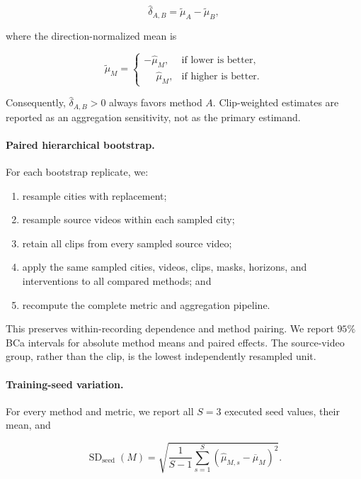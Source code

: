 \begin{equation*}
\widehat\delta_{A,B}
=
\widetilde\mu_A
-
\widetilde\mu_B,
\end{equation*}

where the direction-normalized mean is

\begin{equation*}
\widetilde\mu_M
=
\begin{cases}
-\widehat\mu_M, & \text{if lower is better},\\
\phantom{-}\widehat\mu_M, & \text{if higher is better}.
\end{cases}
\end{equation*}

Consequently, \(\widehat\delta_{A,B}>0\) always favors method \(A\).
Clip-weighted estimates are reported as an aggregation sensitivity,
not as the primary estimand.

\paragraph{Paired hierarchical bootstrap.}
For each bootstrap replicate, we:

\begin{enumerate}
    \item resample cities with replacement;
    \item resample source videos within each sampled city;
    \item retain all clips from every sampled source video;
    \item apply the same sampled cities, videos, clips, masks, horizons,
    and interventions to all compared methods; and
    \item recompute the complete metric and aggregation pipeline.
\end{enumerate}

This preserves within-recording dependence and method pairing.
We report \(95\%\) BCa intervals for absolute method means and paired
effects. The source-video group, rather than the clip, is the lowest
independently resampled unit.

\paragraph{Training-seed variation.}
For every method and metric, we report all \(S=3\) executed seed values,
their mean, and

\begin{equation*}
\operatorname{SD}_{\mathrm{seed}}(M)
=
\sqrt{
\frac{1}{S-1}
\sum_{s=1}^{S}
\left(
\widehat\mu_{M,s}
-
\overline\mu_M
\right)^2
}.
\end{equation*}

